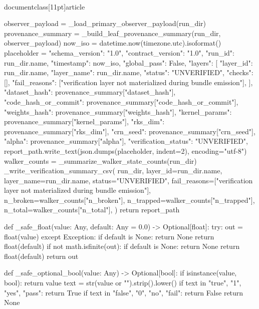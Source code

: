 \\documentclass[11pt]{article}
\begin{document}
\begin{CodeBlock}
    observer_payload = _load_primary_observer_payload(run_dir)
    provenance_summary = _build_leaf_provenance_summary(run_dir, observer_payload)
    now_iso = datetime.now(timezone.utc).isoformat()
    placeholder = {
        "schema_version": "1.0",
        "contract_version": "1.0",
        "run_id": run_dir.name,
        "timestamp": now_iso,
        "global_pass": False,
        "layers": [
            {
                "layer_id": run_dir.name,
                "layer_name": run_dir.name,
                "status": "UNVERIFIED",
                "checks": [],
                "fail_reasons": ["verification layer not materialized during bundle emission"],
            }
        ],
        "dataset_hash": provenance_summary["dataset_hash"],
        "code_hash_or_commit": provenance_summary["code_hash_or_commit"],
        "weights_hash": provenance_summary["weights_hash"],
        "kernel_params": provenance_summary["kernel_params"],
        "rks_dim": provenance_summary["rks_dim"],
        "crn_seed": provenance_summary["crn_seed"],
        "alpha": provenance_summary["alpha"],
        "verification_status": "UNVERIFIED",
    }
    report_path.write_text(json.dumps(placeholder, indent=2), encoding="utf-8")
    walker_counts = _summarize_walker_state_counts(run_dir)
    _write_verification_summary_csv(
        run_dir,
        layer_id=run_dir.name,
        layer_name=run_dir.name,
        status="UNVERIFIED",
        fail_reasons=["verification layer not materialized during bundle emission"],
        n_broken=walker_counts["n_broken"],
        n_trapped=walker_counts["n_trapped"],
        n_total=walker_counts["n_total"],
    )
    return report_path


def _safe_float(value: Any, default: Any = 0.0) -> Optional[float]:
    try:
        out = float(value)
    except Exception:
        if default is None:
            return None
        return float(default)
    if not math.isfinite(out):
        if default is None:
            return None
        return float(default)
    return out


def _safe_optional_bool(value: Any) -> Optional[bool]:
    if isinstance(value, bool):
        return value
    text = str(value or "").strip().lower()
    if text in {"true", "1", "yes", "pass"}:
        return True
    if text in {"false", "0", "no", "fail"}:
        return False
    return None



\end{CodeBlock}
\end{document}
